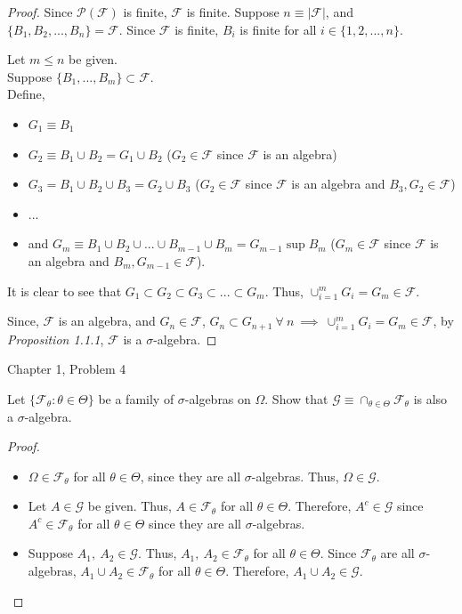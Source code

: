 \documentclass[12pt,letterpaper, onecolumn]{exam}
\newcommand{\power}{\mathcal{P}}
\newcommand{\sigmaF}{\mathcal{F}}
\newcommand{\sigmaG}{\mathcal{G}}
\begin{document}
\begin{questions}
\begin{solution}
\begin{proof}
    Since $\power(\sigmaF)$ is finite, $\sigmaF$ is finite. Suppose $n \equiv |\sigmaF|$, and $\{B_1, B_2, ... , B_n\} = \sigmaF$. Since $\sigmaF$ is finite, $B_i$ is finite for all $i \in \{1, 2, ... , n\}.$

    Let $m \leq n$ be given. \\
    Suppose $\{B_1, ... , B_m\} \subset \sigmaF$. \\
    Define, 
    \begin{itemize}
    \item $G_1 \equiv B_1$
    \item $G_2 \equiv B_1 \cup B_2 = G_1 \cup B_2$ ($G_2 \in \sigmaF$ since $\sigmaF$ is an algebra)
    \item $G_3 = B_1 \cup B_2 \cup B_3 = G_2 \cup B_3$ ($G_2 \in \sigmaF$ since $\sigmaF$ is an algebra and $B_3, G_2 \in \sigmaF$)
    \item ... 
    \item and $G_m \equiv B_1 \cup B_2 \cup ... \cup B_{m-1} \cup B_m = G_{m-1} \sup B_m$ ($G_m \in \sigmaF$ since $\sigmaF$ is an algebra and $B_m, G_{m-1} \in \sigmaF$). 
    \end{itemize}
    It is clear to see that $G_1 \subset G_2 \subset G_3 \subset ... \subset G_m$. Thus, $\cup_{i=1}^m G_i = G_m \in \sigmaF$.

    Since, $\sigmaF$ is an algebra, and $G_n \in \sigmaF$, $G_n \subset G_{n+1} \: \forall \: n \: \implies \: \cup_{i=1}^m G_i = G_m \in \sigmaF$, by \textit{Proposition 1.1.1}, $\sigmaF$ is a $\sigma$-algebra. 
    \end{proof}
    \end{solution}

    \question Chapter 1, Problem 4

    Let $\{\sigmaF_\theta : \theta \in  \Theta\}$ be a family of $\sigma$-algebras on $\Omega$. Show that $\sigmaG \equiv \cap_{\theta \in \Theta} \sigmaF_\theta$ is also a $\sigma$-algebra.

    \begin{solution}
    \begin{proof}
    \begin{itemize}
        \item[(a)] $\Omega \in \sigmaF_\theta$ for all $\theta \in \Theta$, since they are all $\sigma$-algebras. Thus, $\Omega \in \sigmaG$.
        \item[(b)] Let $A \in \sigmaG$ be given. Thus, $A \in \sigmaF_\theta$ for all $\theta \in \Theta$. Therefore, $A^c \in \sigmaG$ since $A^c \in \sigmaF_\theta$ for all $\theta \in \Theta$ since they are all $\sigma$-algebras.
        \item[(c)] Suppose $A_1, \: A_2 \in \sigmaG$. Thus, $A_1, \: A_2 \in \sigmaF_\theta$ for all $\theta \in \Theta$. Since $\sigmaF_\theta$ are all $\sigma$-algebras, $A_1 \cup A_2 \in \sigmaF_\theta$ for all $\theta \in \Theta$. Therefore, $A_1 \cup A_2 \in \sigmaG$.


\end{itemize}
\end{proof}
\end{solution}
\end{questions}
\end{document}

